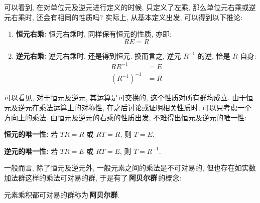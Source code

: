        \hspace*{2em}可以看到, 在对单位元及逆元进行定义的时候, 只定义了左乘, 那么单位元右乘或逆元右乘时, 还会有相同的性质吗? 实际上, 从基本定义出发, 可以得到以下推论:

            \begin{Property}[恒元及逆元的右乘]
                \hspace*{2em}
                \begin{enumerate}
                    \item \textbf{恒元右乘:} 恒元右乘时, 同样保有恒元的性质, 亦即:
                        \begin{equation}
                            RE = R
                        \end{equation}
                    \item \textbf{逆元右乘:} 逆元右乘时, 还是得到恒元. 换而言之, 逆元 $R^{-1}$ 的逆, 恰是 $R$ 自身:
                        \begin{align}
                            RR^{-1} &= E \\
                            (R^{-1})^{-1} &= R
                        \end{align}
                \end{enumerate}
            \end{Property}

        \hspace*{2em}可以看见, 对于恒元及逆元, 其运算是可交换的, 这个性质对所有群均成立. 由于恒元及逆元在乘法运算上的对称性, 在之后讨论或证明相关性质时, 可以只考虑一个方向上的乘法. 由恒元及逆元的右乘的性质出发, 不难得出恒元及逆元的唯一性:

            \begin{Property}[恒元及逆元的唯一性]
                \hspace*{2em}
                \item \textbf{恒元的唯一性:} 若 $TR = R$ 或 $RT = R$, 则 $T = E$.
                \item \textbf{逆元的唯一性:} 若 $TR = E$ 或 $RT = E$, 则 $T = R^{-1}$.
            \end{Property}

        \hspace*{2em}一般而言, 除了恒元及逆元外, 一般元素之间的乘法是不可对易的, 但也存在如实数加法群这样的乘法可对易的群, 于是有了\,\textbf{阿贝尔群}\,的概念:

            \begin{Concept}[阿贝尔群]
                元素乘积都可对易的群称为\,\textbf{阿贝尔群}.
            \end{Concept}

